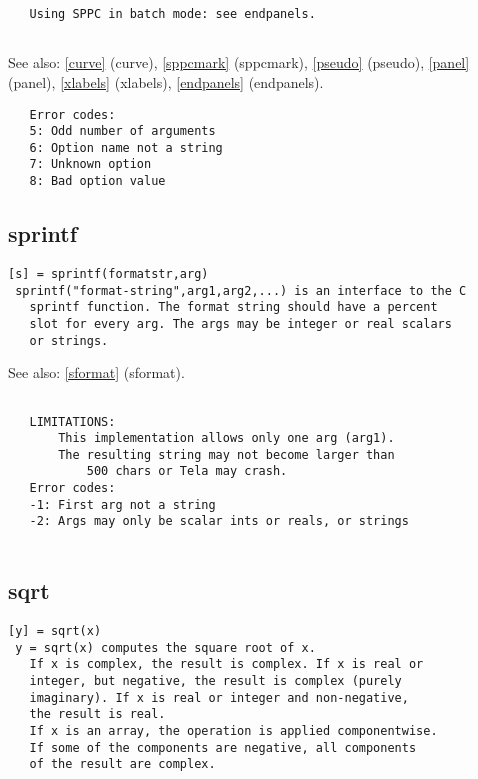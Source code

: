 \documentclass[a4paper]{article}
\begin{document}
\begin{tscreen}
\begin{verbatim}
   Using SPPC in batch mode: see endpanels.
  
\end{verbatim}

See also: \ref{curve} {(curve)}, \ref{sppcmark} {(sppcmark)}, \ref{pseudo} {(pseudo)}, \ref{panel} {(panel)}, \ref{xlabels} {(xlabels)}, \ref{endpanels} {(endpanels)}.
\begin{verbatim}
   Error codes:
   5: Odd number of arguments
   6: Option name not a string
   7: Unknown option
   8: Bad option value
\end{verbatim}
\end{tscreen}





\subsection{sprintf\label{sprintf}}

\begin{tscreen}
\begin{verbatim}
[s] = sprintf(formatstr,arg)
 sprintf("format-string",arg1,arg2,...) is an interface to the C
   sprintf function. The format string should have a percent
   slot for every arg. The args may be integer or real scalars
   or strings.
\end{verbatim}

See also: \ref{sformat} {(sformat)}.
\begin{verbatim}

   LIMITATIONS:
       This implementation allows only one arg (arg1).
       The resulting string may not become larger than
           500 chars or Tela may crash.
   Error codes:
   -1: First arg not a string
   -2: Args may only be scalar ints or reals, or strings
   
\end{verbatim}
\end{tscreen}





\subsection{sqrt\label{sqrt}}

\begin{tscreen}
\begin{verbatim}
[y] = sqrt(x)
 y = sqrt(x) computes the square root of x.
   If x is complex, the result is complex. If x is real or
   integer, but negative, the result is complex (purely
   imaginary). If x is real or integer and non-negative,
   the result is real.
   If x is an array, the operation is applied componentwise.
   If some of the components are negative, all components
   of the result are complex.
\end{verbatim}
\end{tscreen}
\end{document}
